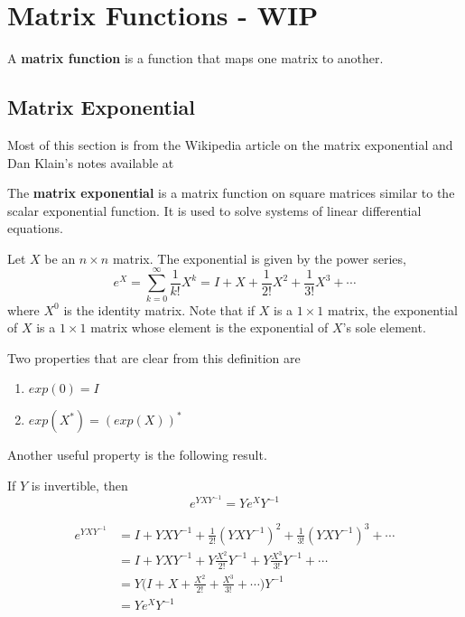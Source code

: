 \chapter{Matrix Functions - WIP} 

A \textbf{matrix function} is a function that maps one matrix to another. 

\section{Matrix Exponential}

Most of this section is from the Wikipedia article on the matrix exponential and Dan Klain's notes available at 

\begin{definition}
The \textbf{matrix exponential} is a matrix function on square matrices similar to the scalar exponential function. It is used to solve systems of linear differential equations. 

Let $X$ be an $n \times n$ matrix. The exponential is given by the power series, 
$$e^{X} = \sum_{k=0}^{\infty} \frac{1}{k!} X^{k} = I + X + \frac{1}{2!} X^{2} + \frac{1}{3!} X^{3} + \cdots $$
where $X^{0}$ is the identity matrix. Note that if $X$ is a $1 \times 1$ matrix, the exponential of $X$ is a $1 \times 1$ matrix whose element is the exponential of $X$'s sole element. 
\end{definition}

Two properties that are clear from this definition are 
\begin{enumerate}
	\item $exp(0) = I$ 
	\item $exp(X^{*}) = (exp(X))^{*}$
\end{enumerate}

Another useful property is the following result.

\begin{lemma}
If $Y$ is invertible, then 
$$e^{YXY^{-1}} = Ye^{X}Y^{-1}$$
\end{lemma}

\begin{lproof}
$$
\begin{aligned}
e^{YXY^{-1}} &= I + YXY^{-1} + \frac{1}{2!} (YXY^{-1})^{2} + \frac{1}{3!} (YXY^{-1})^{3} + \cdots \\
&= I + YXY^{-1} + Y \frac{X^{2}}{2!} Y^{-1} + Y \frac{X^{3}}{3!} Y^{-1} + \cdots \\
&= Y \Big( I + X + \frac{X^{2}}{2!} + \frac{X^{3}}{3!} + \cdots \Big) Y^{-1} \\
&= Ye^{X} Y^{-1}
\end{aligned}
$$
\end{lproof}

